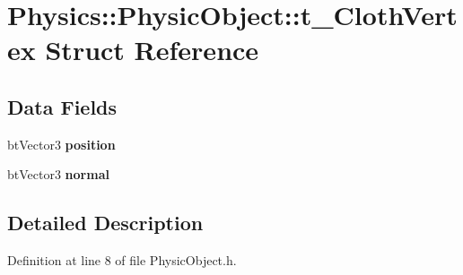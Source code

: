 \hypertarget{struct_physics_1_1_physic_object_1_1t___cloth_vertex}{}\section{Physics\+:\+:Physic\+Object\+:\+:t\+\_\+\+Cloth\+Vertex Struct Reference}
\label{struct_physics_1_1_physic_object_1_1t___cloth_vertex}
\subsection*{Data Fields}
\begin{DoxyCompactItemize}
\item 
bt\+Vector3 {\bfseries position}\hypertarget{struct_physics_1_1_physic_object_1_1t___cloth_vertex_aae27ddd5b4d83838b569f044183c4262}{}\label{struct_physics_1_1_physic_object_1_1t___cloth_vertex_aae27ddd5b4d83838b569f044183c4262}

\item 
bt\+Vector3 {\bfseries normal}\hypertarget{struct_physics_1_1_physic_object_1_1t___cloth_vertex_a4ad52f2776ec5225eafd2b3e6c8536f8}{}\label{struct_physics_1_1_physic_object_1_1t___cloth_vertex_a4ad52f2776ec5225eafd2b3e6c8536f8}

\end{DoxyCompactItemize}


\subsection{Detailed Description}


Definition at line 8 of file Physic\+Object.\+h.

